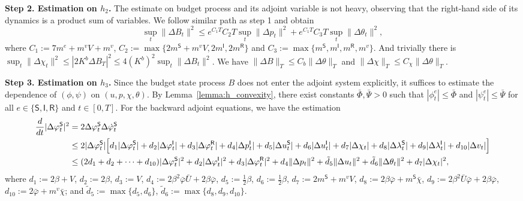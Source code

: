 \documentclass[letterpaper, 10 pt, conference]{ieeeconf}  %
\def\sS{\mathsf{S}}
\def\sI{\mathsf{I}}
\def\sR{\mathsf{R}}
\begin{document}
\textbf{Step 2. Estimation on $h_2$.} The estimate on budget process and its adjoint variable is not heavy, observing that the right-hand side of its dynamics is a product sum of variables. We follow similar path as step 1 and obtain
$$\sup_t \|\Delta B_t\|^2 \leq e^{C_1 T}C_2 T \sup_t\|\Delta p_t\|^2 + e^{C_1 T}C_3 T\sup_t \|\Delta \theta_t\|^2,$$
where $C_1 := 7m^e + m^v V+m^v$, $C_2 := \max\{2m^\sS+m^vV,2m^\sI,2m^\sR\}$ and $C_3:=\max\{m^\sS, m^\sI, m^\sR,m^v\}$. And trivially there is $\sup_t \|\Delta \chi_t\|^2 \leq |2 K^b \Delta B_T|^2\leq 4(K^b)^2 \sup_t \|\Delta B_t\|^2$. We have $\|\Delta B\|_T \leq C_b \|\Delta \theta\|_T$ and $\|\Delta \chi\|_T \leq C_\chi \|\Delta \theta\|_T$.

\textbf{Step 3. Estimation on $h_3$.}
Since the budget state process $B$ does not enter the adjoint system explicitly, it suffices to estimate the dependence of $(\phi,\psi)$ on $(u,p,\chi,\theta)$. By Lemma~\ref{lemma:h_convexity}, there exist constants $\bar \Phi,\bar \Psi > 0$ such that $|\phi_t^e| \le \bar \Phi$ and $|\psi_t^e| \le \bar \Psi$ for all $e \in \{\sS,\sI,\sR\}$ and $t \in [0,T]$.
For the backward adjoint equations, we have the estimation
$$
\begin{aligned}
\frac{d}{dt} |\Delta \varphi_t^{\sS}|^2
&= 2\Delta \varphi_t^{\sS}\Delta \dot \varphi_t^{\sS} \\ & \leq 2|\Delta \varphi_t^{\sS}|
\Bigl[
d_1 |\Delta \varphi_t^{\sS}| + d_2 |\Delta \varphi_t^{\sI}| + d_3 |\Delta \varphi_t^{\sR}| + d_4 |\Delta p_t^\sI| +d_5 |\Delta u_t^\sS| + d_6 |\Delta u_t^\sI| + d_7 |\Delta \chi_t| + d_8 |\Delta \lambda_t^\sS| + d_9 |\Delta \lambda_t^\sI| + d_{10} |\Delta v_t|
\Bigr] \\
&\le (2d_1+d_2+\cdots+d_{10})|\Delta \varphi_t^{\sS}|^2 + d_2|\Delta \varphi_t^{\sI}|^2 + d_3|\Delta \varphi_t^{\sR}|^2 + d_4\|\Delta p_t\|^2 + \tilde{d}_5\|\Delta u_t\|^2 + \tilde{d}_6\|\Delta \theta_t\|^2 + d_7|\Delta \chi_t|^2,
\end{aligned}$$
where $d_1 := 2\beta + V$, $d_2 := 2\beta$, $d_3 := V$, $d_4 := 2\beta^2 \bar{\varphi} \bar{U}+2\beta \bar{\varphi}$, $d_5 := \frac{1}{2}\beta$, $d_6 := \frac{1}{2}\beta$, $d_7 := 2m^\sS + m^v V$, $d_8 := 2\beta \bar{\varphi} + m^\sS \bar{\chi}$, $d_9 := 2\beta^2 \bar{U} \bar{\varphi} + 2 \beta \bar{\varphi}$, $d_{10} := 2\bar{\varphi} + m^v \bar{\chi}$; and $\tilde{d}_5:=\max\{d_5,d_6\}$, $\tilde{d}_6:=\max\{d_8,d_9,d_{10}\}$.
\end{document}
